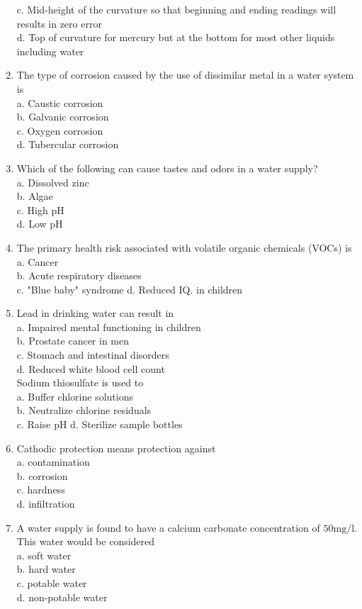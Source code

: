 \begin{enumerate}[1.]
c. Mid-height of the curvature so that beginning and ending readings will results in zero error\\
d. Top of curvature for mercury but at the bottom for most other liquids including water\\
\item The type of corrosion caused by the use of dissimilar metal in a water system is\\
a. Caustic corrosion\\
b. Galvanic corrosion\\
c. Oxygen corrosion\\
d. Tubercular corrosion\\
\item Which of the following can cause tastes and odors in a water supply?\\
a. Dissolved zinc\\
b. Algae\\
c. High $\mathrm{pH}$\\
d. Low $\mathrm{pH}$\\
\item The primary health risk associated with volatile organic chemicals (VOCs) is\\
a. Cancer\\
b. Acute respiratory diseases\\
c. "Blue baby" syndrome d. Reduced IQ. in children\\
\item Lead in drinking water can result in\\
a. Impaired mental functioning in children\\
b. Prostate cancer in men\\
c. Stomach and intestinal disorders\\
d. Reduced white blood cell count\\
Sodium thiosulfate is used to\\
a. Buffer chlorine solutions\\
b. Neutralize chlorine residuals\\
c. Raise pH d. Sterilize sample bottles\\
\item Cathodic protection means protection against\\
a. contamination\\
b. corrosion\\
c. hardness\\
d. infiltration\\
\item A water supply is found to have a calcium carbonate concentration of $50 \mathrm{mg} / \mathrm{l}$. This water would be considered\\
a. soft water\\
b. hard water\\
c. potable water\\
d. non-potable water\\


\end{enumerate}
